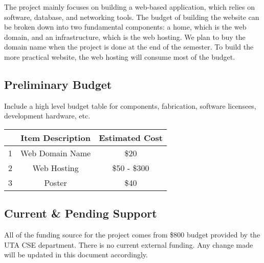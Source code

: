 The project mainly focuses on building a web-based application, which relies on software, database, and networking tools. The budget of building the website can be broken down into two fundamental components: a home, which is the web domain, and an infrastructure, which is the web hosting. We plan to buy the domain name when the project is done at the end of the semester. To build the more practical website, the web hosting will consume most of the budget.

\subsection{Preliminary Budget}
Include a high level budget table for components, fabrication, software licensees, development hardware, etc.

\begin{center}
\begin{tabular}{||c | c | c ||} 
 \hline
   & Item Description & Estimated Cost \\ [0.5ex] 
 \hline\hline
 1 & Web Domain Name & \$20 \\ 
 \hline
 2 & Web Hosting & \$50 - \$300  \\ 
  \hline
 3 & Poster & \$40  \\ [1ex] 
 \hline
\end{tabular}
\end{center}

\subsection{Current \& Pending Support}
All of the funding source for the project comes from \$800 budget provided by the UTA CSE department. There is no current external funding. Any change made will be updated in this document accordingly.